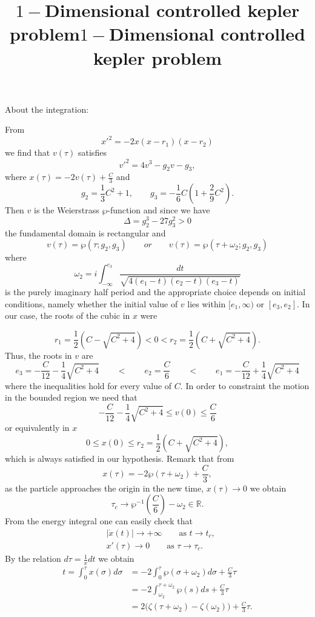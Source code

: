 \documentclass{article}
\title{$1-$Dimensional controlled kepler problem}
\begin{document}
\title{$1-$Dimensional controlled kepler problem}


\section{}
About the integration:

From
$$
x'^2 = -2x(x-r_1)(x-r_2)
$$
we find that $v(\tau)$ satisfies 
$$
v'^2 = 4v^3 - g_2 v - g_3,
$$
where  $x(\tau) = -2v(\tau) + \frac{C}{3}$ and
 $$
g_2 = \frac{1}{3}C^2 +1, \qquad  g_3 =- \frac{1}{6}C(1+\frac{2}{9}C^2).
 $$
 Then $v$ is the Weierstrass $\wp$-function and since we have
 $$
\Delta = g_2^3 - 27 g_3^2 > 0
 $$
the fundamental domain is rectangular and
 $$
v(\tau) = \wp(\tau; g_2,g_3) \qquad or \qquad v(\tau) = \wp(\tau+\omega_2; g_2,g_3) 
 $$
where 
\[
\omega_2 = i\int_{-\infty}^{e_3}\frac{dt}{\sqrt{4(e_1-t)(e_2-t)(e_3-t)}}
\]
is the purely imaginary half period and the appropriate choice depends on initial conditions, namely whether the initial value of $v$ lies within $[e_1, \infty)$ or $[e_3, e_2]$.
In our case, the roots of the cubic in $x$ were

 $$
r_1 = \frac{1}{2}(C-\sqrt{C^2+4}) <  0 < r_2 = \frac{1}{2}(C+\sqrt{C^2+4}).
 $$
Thus, the roots in $v$ are
 $$
e_3 = -\frac{C}{12} - \frac{1}{4}\sqrt{C^2+4} \qquad < \qquad e_2 =  \frac{C}{6} \qquad < \qquad e_1 =-\frac{C}{12} + \frac{1}{4}\sqrt{C^2+4}
 $$
where the inequalities hold for every value of $C$.
In order to constraint the motion in the bounded region we need that
 $$
-\frac{C}{12} - \frac{1}{4}\sqrt{C^2+4}  \leq v(0) \leq  \frac{C}{6} 
 $$
or equivalently in $x$
 $$
0 \leq x(0) \leq  r_2 = \frac{1}{2}(C+\sqrt{C^2+4}),
$$
which is always satisfied in our hypothesis. Remark that from
\[
x(\tau) = -2\wp(\tau+\omega_2)+\frac{C}{3},
\]
as the particle approaches the origin in the new time, $x(\tau) \to 0$ we obtain
\[
\tau_c \to \wp^{-1}(\frac{C}{6})-\omega_2 \in \mathds{R}.
\]
From the energy integral one can easily check that
\begin{equation*}
\begin{split}
&|\dot x(t)| \longrightarrow +\infty \qquad \text{as } t \to t_c, \\
& x'(\tau) \longrightarrow 0 \qquad \text{as } \tau  \to \tau_c.
 \end{split}
\end{equation*}
By the relation $d\tau = \frac{1}{x} dt$ we obtain
\begin{equation*}
    \begin{split}
        t = \int_{0}^{\tau} x(\sigma) d\sigma 
         &= -2\int_{0}^{\tau} \wp(\sigma + \omega_2) d\sigma + \frac{C}{3}\tau \\
         &= -2\int_{\omega_2}^{\tau+\omega_2} \wp(s)ds + \frac{C}{3}\tau \\
         &= 2\big(\zeta(\tau + \omega_2) - \zeta(\omega_2)\big) + \frac{C}{3}\tau.
    \end{split}
\end{equation*}
\end{document}
